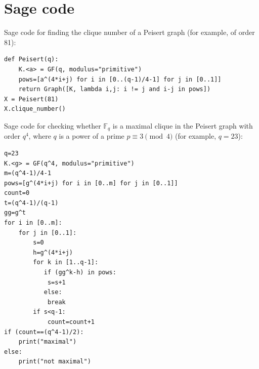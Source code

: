 \documentclass[12pt,oneside]{amsart}
\newcommand{\F}{\mathbb{F}}
\begin{document}
\appendix
\section{Sage code}

Sage code for finding the clique number of a Peisert graph (for example, of order 81):

\begin{lstlisting}
def Peisert(q):
    K.<a> = GF(q, modulus="primitive")
    pows=[a^(4*i+j) for i in [0..(q-1)/4-1] for j in [0..1]]
    return Graph([K, lambda i,j: i != j and i-j in pows])
X = Peisert(81)
X.clique_number()
\end{lstlisting}

Sage code for checking whether $\F_q$ is a maximal clique in the Peisert graph with order $q^4$, where $q$ is a power of a prime $p \equiv 3 \pmod 4$ (for example, $q=23$):

\begin{lstlisting}
q=23
K.<g> = GF(q^4, modulus="primitive")
m=(q^4-1)/4-1
pows=[g^(4*i+j) for i in [0..m] for j in [0..1]]
count=0
t=(q^4-1)/(q-1)
gg=g^t
for i in [0..m]:
    for j in [0..1]:
        s=0
        h=g^(4*i+j)
        for k in [1..q-1]:
           if (gg^k-h) in pows: 
            s=s+1
           else:
            break
        if s<q-1:
            count=count+1
if (count==(q^4-1)/2):
    print("maximal")
else:
    print("not maximal")
\end{lstlisting}
\end{document}

